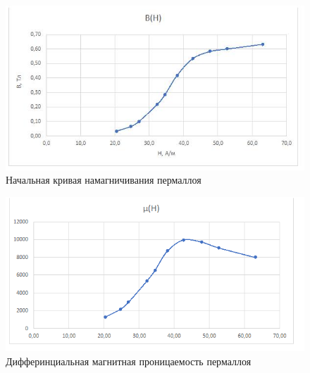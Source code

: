 \documentclass[a4paper, 12pt]{article}
\begin{document}
\begin{enumerate}
\begin{figure}[H]
    \centering
    \includegraphics[scale=0.7]{пермаллой1.png}
    \caption{ Начальная кривая намагничивания пермаллоя}
    \label{fig:scheme}
\end{figure}

\begin{figure}[H]
    \centering
    \includegraphics[scale=0.7]{пермаллой2.png}
    \caption{ Дифферинциальная магнитная проницаемость пермаллоя}
    \label{fig:scheme}
\end{figure}



\end{enumerate}
\end{document}
